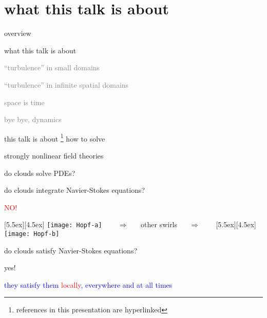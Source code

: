 \section[what this talk is about]
 {what this talk is about}

\begin{frame}{overview}
\begin{enumerate}
              \item {\Large
what this talk is about
                  }\textcolor{gray}{\small
              \item
``turbulence'' in small domains
              \item
``turbulence'' in infinite spatial domains
              \item
space is time
              \item
bye bye, dynamics
                    }
            \end{enumerate}
\end{frame}

\begin{frame}{this talk is about
\footnote{references in this presentation are hyperlinked}
}
how to solve

\vfill

{\Large
strongly nonlinear field theories
                  }
\end{frame}


\begin{frame}{do clouds solve PDEs?}

do clouds integrate Navier-Stokes equations?

\begin{center}
\centerline{\textcolor{red}{\Huge NO!}}

\begin{minipage}[t]{\textwidth}
	\begin{center}
\centerline{
\raisebox{-4.0ex}[5.5ex][4.5ex]
		 {\texttt{[image: Hopf-a]}}
~~~ $\Longrightarrow$ ~~ {other swirls} ~~ $\Longrightarrow$ ~~~
	\raisebox{-4.0ex}[5.5ex][4.5ex]
		 {\texttt{[image: Hopf-b]}}
          }
	\end{center}
\end{minipage}
\end{center}

do clouds satisfy Navier-Stokes equations?

\bigskip

{\Large yes!}

\centerline{
\textcolor{blue}{they satisfy them \textcolor{red}{\large locally}, everywhere and at all times}
}
\end{frame}

